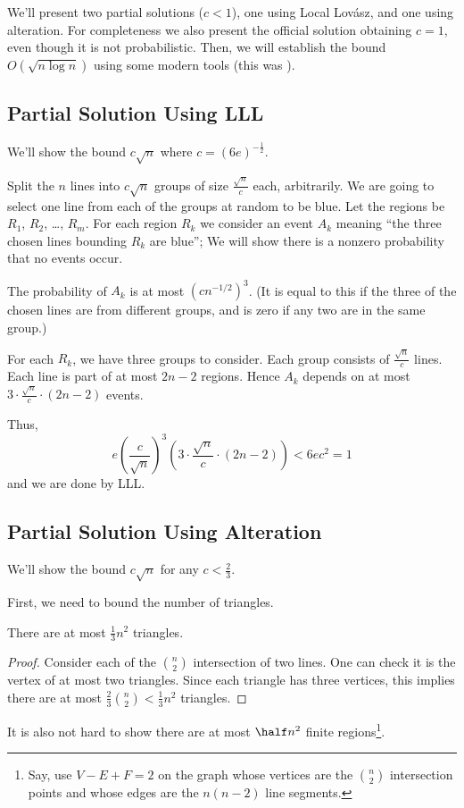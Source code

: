 \documentclass[11pt]{scrartcl}
\begin{document}
We'll present two partial solutions ($c < 1$), one using Local Lov\'asz, and one using alteration.
For completeness we also present the official solution obtaining $c=1$, even though it is not probabilistic.
Then, we will establish the bound $O(\sqrt{n \log n})$ using some modern tools (this was \cite{potalk}).

\subsection{Partial Solution Using LLL}
We'll show the bound $c \sqrt n$ where $c = (6e)^{-\frac12}$.

Split the $n$ lines into $c \sqrt n$
groups of size $\frac{\sqrt n}{c}$ each, arbitrarily.
We are going to select one line from each of the groups at random to be blue.
Let the regions be $R_1$, $R_2$, \dots, $R_m$.
For each region $R_k$ we consider an event $A_k$ meaning
``the three chosen lines bounding $R_k$ are blue'';
We will show there is a nonzero probability that no events occur.

The probability of $A_k$ is at most $\left( cn^{-1/2} \right)^3$.
(It is equal to this if the three of the chosen lines are from different groups,
and is zero if any two are in the same group.)

For each $R_k$, we have three groups to consider.
Each group consists of $\frac{\sqrt n}{c}$ lines.
Each line is part of at most $2n-2$ regions.
Hence $A_k$ depends on at most $3 \cdot \frac{\sqrt n}{c} \cdot (2n-2)$ events.

Thus,
\[ e \left( \frac{c}{\sqrt n} \right)^3 \left( 3 \cdot \frac{\sqrt{n}}{c} \cdot (2n-2) \right)
  < 6ec^2 = 1 \]
and we are done by LLL.

\subsection{Partial Solution Using Alteration}
We'll show the bound $c \sqrt n$ for any $c < \frac 23$.

First, we need to bound the number of triangles.
\begin{claim*}
  There are at most $\frac 13 n^2$ triangles.
\end{claim*}
\begin{proof}
  Consider each of the $\binom n2$ intersection of two lines.
  One can check it is the vertex of at most two triangles.
  Since each triangle has three vertices,
  this implies there are at most $\frac 23 \binom n2 < \frac{1}{3} n^2$ triangles.
\end{proof}
It is also not hard to show there are at most $\half n^2$ finite regions\footnote{Say, use $V-E+F=2$ on the graph whose vertices are the $\binom n2$ intersection points and whose edges are the $n(n-2)$ line segments.}.
\end{document}
